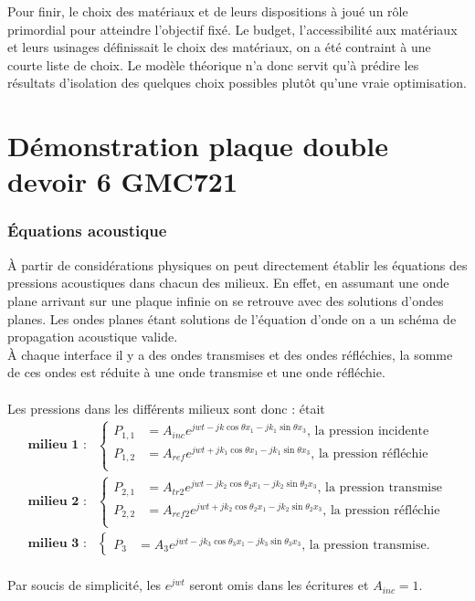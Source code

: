 \documentclass[12pt,foolscap]{report}
\begin{document}
	Pour finir, le choix des matériaux et de leurs dispositions à joué un rôle primordial pour atteindre l'objectif fixé. Le budget, l'accessibilité aux matériaux et leurs usinages définissait le choix des matériaux, on a été contraint à une courte liste de choix. Le modèle théorique n'a donc servit qu'à prédire les résultats d'isolation des quelques choix possibles plutôt qu'une vraie optimisation.\\
	
	\printbibliography
	\appendix
	\chapter{Démonstration plaque double devoir 6 GMC721}
	\label{ch:demodev6}
	\subsection*{Équations acoustique}
	À partir de considérations physiques on peut directement établir les équations des pressions acoustiques dans chacun des milieux. En effet, en assumant une onde plane arrivant sur une plaque infinie on se retrouve avec des solutions d'ondes planes. Les ondes planes étant solutions de l'équation d'onde on a un schéma de propagation acoustique valide.\\ 
	À chaque interface il y a des ondes transmises et des ondes réfléchies, la somme de ces ondes est réduite à une onde transmise et une onde réfléchie.\\ \\
	Les pressions dans les différents milieux sont donc : était
	\begin{align}
	\textbf{milieu 1 :} &
	\begin{cases}
	P_{1,1} &= A_{inc}e^{jwt-jk\cos\theta x_1-jk_1\sin\theta x_3} \text{, la pression incidente}\\
	P_{1,2} &= A_{ref}e^{jwt+jk_1\cos\theta x_1-jk_1\sin\theta x_3}\text{, la pression réfléchie}\\
	\end{cases}\\
	\textbf{milieu 2 :} &
	\begin{cases}
	P_{2,1} &= A_{tr2}e^{jwt-jk_2\cos\theta_2 x_1-jk_2\sin\theta_2 x_3} \text{, la pression transmise}\\
	P_{2,2} &= A_{ref2}e^{jwt+jk_2\cos\theta_2 x_1-jk_2\sin\theta_2 x_3}\text{, la pression réfléchie}\\
	\end{cases}\\
	\textbf{milieu 3 :} &
	\begin{cases}
	P_{3} &= A_{3}e^{jwt-jk_3\cos\theta_3 x_1-jk_3\sin\theta_3 x_3} \text{, la pression transmise.}
	\end{cases}
	\end{align}\\
	Par soucis de simplicité, les $e^{jwt}$ seront omis dans les écritures et $A_{inc}=1$.
\end{document}
